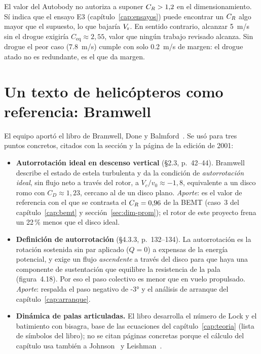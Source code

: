 \begin{nota}
El valor del Autobody no autoriza a suponer $C_{R}>1{,}2$ en el dimensionamiento. Sí indica
que el ensayo E3 (capítulo~\ref{cap:ensayos}) puede encontrar un $C_{R}$ algo mayor que el
supuesto, lo que bajaría $V_{\mathrm{r}}$. En sentido contrario, alcanzar \SI{5}{m/s} sin el drogue
exigiría $C_{\mathrm{eq}}\approx2{,}55$, valor que ningún trabajo revisado alcanza. Sin
drogue el peor caso (\SI{7.8}{m/s}) cumple  con solo \SI{0.2}{m/s} de margen: el
drogue atado no es redundante, es el que da margen.
\end{nota}

\section{Un texto de helicópteros como referencia: Bramwell}\label{sec:literatura-bramwell}
El equipo aportó el libro de Bramwell, Done y Balmford~\cite{bramwell2001}. Se usó para tres puntos concretos, citados con la sección y la página de la edición de 2001:
\begin{itemize}
  \item \textbf{Autorrotación ideal en descenso vertical} (\S2.3, p.~42--44). Bramwell describe el estado de estela turbulenta y da la condición de
        \emph{autorrotación ideal}, sin flujo neto a través del rotor, a $V_c/v_0\approx-1{,}8$, equivalente a un disco romo con $C_D\approx1{,}23$,
        cercano al de un disco plano. \emph{Aporte}: es el valor de referencia con el que se contrasta el $C_{R}=0{,}96$ de la BEMT (caso~3 del
        capítulo~\ref{cap:bemt} y sección~\ref{sec:dim-prom}); el rotor de este proyecto frena un 22\,\% menos que el disco ideal.
  \item \textbf{Definición de autorrotación} (\S4.3.3, p.~132--134). La autorrotación es la rotación sostenida sin par aplicado ($Q=0$) a expensas de la energía
        potencial, y exige un flujo \emph{ascendente} a través del disco para que haya una componente de sustentación que equilibre la resistencia de la pala
        (figura~4.18). Por eso el paso colectivo es menor que en vuelo propulsado. \emph{Aporte}: respalda el paso negativo de \ang{-3} y el análisis de
        arranque del capítulo~\ref{cap:arranque}.
  \item \textbf{Dinámica de palas articuladas.} El libro desarrolla el número de Lock y el batimiento con bisagra, base de las ecuaciones del capítulo~\ref{cap:teoria}
        (lista de símbolos del libro); no se citan páginas concretas porque el cálculo del capítulo usa también a Johnson~\cite{johnson1980} y
        Leishman~\cite{leishman2006}.
\end{itemize}

